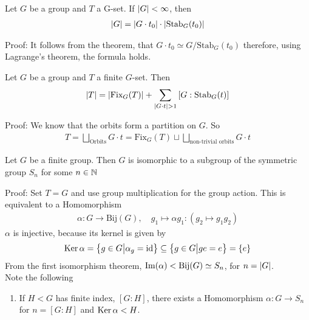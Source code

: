 
\begin{corollary}[]
Let $G$ be a group and $T$ a G-set. If $\vert G\vert < \infty$, then
\begin{align*}
	\vert G\vert = \vert G \cdot t_0\vert \cdot \vert\text{Stab}_G(t_0)\vert
\end{align*}
\end{corollary}
Proof: It follows from the theorem, that $G \cdot t_0 \simeq G/\text{Stab}_G(t_0)$ therefore, using Lagrange's theorem, the formula holds.

\begin{corollary}[]
	Let $G$ be a group and $T$ a finite $G$-set. Then
	\begin{align*}
		\vert T\vert = \vert\text{Fix}_G(T)\vert + \sum_{\vert G \cdot t\vert > 1} \left[G: \text{Stab}_G(t)\right]
	\end{align*}
\end{corollary}
Proof: We know that the orbits form a partition on $G$. So
\begin{align*}
	T = \bigsqcup_{\text{Orbits}} G \cdot t = \text{Fix}_G(T) \sqcup \bigsqcup_{\text{non-trivial orbits}} G \cdot t
\end{align*}



\begin{ntheorem}
	Let $G$ be a finite group. Then $G$ is isomorphic to a subgroup of the symmetric group $S_n$ for some $n \in \mathbb{N}$
\end{ntheorem}
Proof: Set $T = G$ and use group multiplication for the group action. This is equivalent to a Homomorphism
\begin{align*}
	\alpha: G \to \text{Bij}(G), \quad g_1 \mapsto \alpha g_1: (g_2 \mapsto g_1g_2)
\end{align*} 
$\alpha$ is injective, because its kernel is given by
\begin{align*}
	\operatorname{Ker} \alpha = \left\{g \in G \big\vert \alpha_g = \operatorname{id}\right\}	\subseteq \left\{g \in G \big\vert ge = e\right\} = \{e\}
\end{align*}
From the first isomorphism theorem, $\operatorname{Im}(\alpha) < \text{Bij}(G) \simeq S_n$, for $n = \vert G\vert$.\\

Note the following
\begin{enumerate}
	\item If $H < G$ has finite index, $[G:H]$, there exists a Homomorphism $\alpha: G \to S_n$ for $n = [G:H]$ and $\operatorname{Ker} \alpha < H$.
\end{enumerate}


